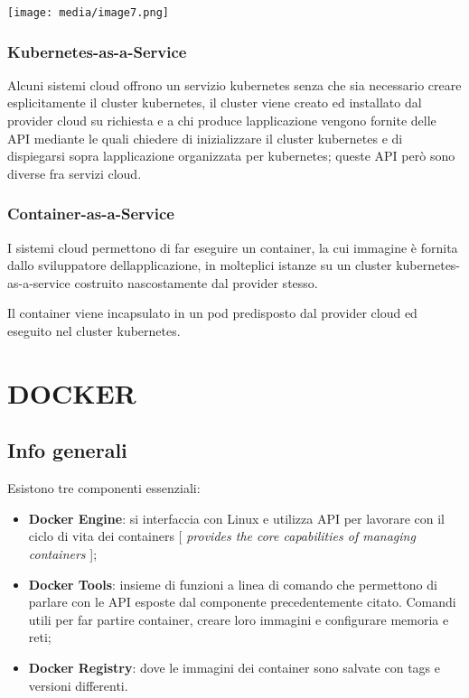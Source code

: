\texttt{[image: media/image7.png]}

\subsubsection{Kubernetes-as-a-Service}\label{kubernetes-as-a-service}

Alcuni sistemi cloud offrono un servizio kubernetes senza che sia
necessario creare esplicitamente il cluster kubernetes, il cluster viene
creato ed installato dal provider cloud su richiesta e a chi produce
l\textquotesingle applicazione vengono fornite delle API mediante le
quali chiedere di inizializzare il cluster kubernetes e di dispiegarsi
sopra l\textquotesingle applicazione organizzata per kubernetes; queste
API però sono diverse fra servizi cloud.

\subsubsection{Container-as-a-Service}\label{container-as-a-service}

I sistemi cloud permettono di far eseguire un container, la cui immagine
è fornita dallo sviluppatore dell\textquotesingle applicazione, in
molteplici istanze su un cluster kubernetes-as-a-service costruito
nascostamente dal provider stesso.

Il container viene incapsulato in un pod predisposto dal provider cloud
ed eseguito nel cluster kubernetes.

\section{DOCKER}\label{docker}

\subsection{Info generali}\label{info-generali}

Esistono tre componenti essenziali:

\begin{itemize}
\item
  \textbf{Docker Engine}: si interfaccia con Linux e utilizza API per
  lavorare con il ciclo di vita dei containers {[} \emph{provides the
  core capabilities of managing containers} {]};
\item
  \textbf{Docker Tools}: insieme di funzioni a linea di comando che
  permettono di parlare con le API esposte dal componente
  precedentemente citato. Comandi utili per far partire container,
  creare loro immagini e configurare memoria e reti;
\item
  \textbf{Docker Registry}: dove le immagini dei container sono salvate
  con tags e versioni differenti.
\end{itemize}

